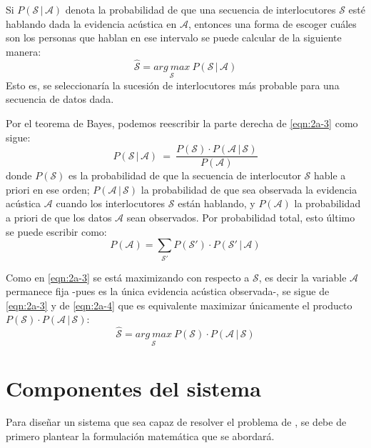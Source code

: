 Si $P(\mathcal{S} \,|\, \mathcal{A})$ denota la probabilidad de que una secuencia de interlocutores $\mathcal{S}$ esté hablando dada la evidencia acústica en $\mathcal{A}$, entonces una forma de escoger cuáles son los personas que hablan en ese intervalo se puede calcular de la siguiente manera:
\begin{equation}
\hat{\mathcal{S}} = \underset{\mathcal{S}}{arg~max}~ P(\mathcal{S} \,|\, \mathcal{A})
\label{eqn:2a-3}
\end{equation}
Esto es, se seleccionaría la sucesión de interlocutores más probable para una secuencia de datos dada.

Por el teorema de Bayes, podemos reescribir la parte derecha de \eqref{eqn:2a-3} como sigue:
\begin{equation}
P(\mathcal{S} \,|\, \mathcal{A}) ~=~ \frac{P(\mathcal{S}) \cdot P(\mathcal{A} \,|\, \mathcal{S})}{P(\mathcal{A})}
\label{eqn:2a-4}
\end{equation}
donde $P(\mathcal{S})$ es la probabilidad de que la secuencia de interlocutor $\mathcal{S}$ hable a priori en ese orden; $P(\mathcal{A} \,|\, \mathcal{S})$ la probabilidad de que sea observada la evidencia acústica $\mathcal{A}$ cuando los interlocutores $\mathcal{S}$ están hablando, y $P(\mathcal{A})$ la probabilidad a priori de que los datos $\mathcal{A}$ sean observados. Por probabilidad total, esto último se puede escribir como: 
\begin{equation}
P(\mathcal{A}) = \sum_{\mathcal{S}'} P(\mathcal{S}') \cdot P(\mathcal{S}' \,|\, \mathcal{A})
\label{eqn:2a-5}  
\end{equation}

Como en \eqref{eqn:2a-3} se está maximizando con respecto a $\mathcal{S}$, es decir la variable $\mathcal{A}$ permanece fija -pues es la única evidencia acústica observada-, se sigue de \eqref{eqn:2a-3} y de \eqref{eqn:2a-4} que es equivalente maximizar únicamente el producto $P(\mathcal{S}) \cdot P(\mathcal{A} \,|\, \mathcal{S})$:
\begin{equation}
\hat{\mathcal{S}} = \underset{\mathcal{S}}{arg~max}~ P(\mathcal{S}) \cdot P(\mathcal{A} \,|\, \mathcal{S})
\label{eqn:2a-6}
\end{equation}

\section{Componentes del sistema}

Para diseñar un sistema que sea capaz de resolver el problema de \sd, se debe de primero plantear la formulación matemática que se abordará. 

